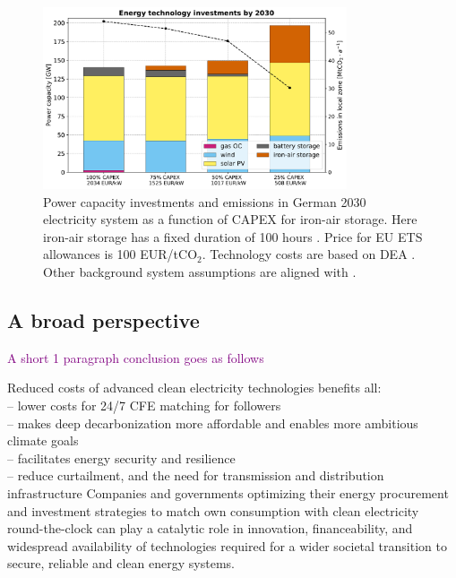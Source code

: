 \documentclass[pdflatex,sn-basic, Numbered]{sn-jnl}%
\theoremstyle{thmstyleone}%
\theoremstyle{thmstyletwo}%
\theoremstyle{thmstylethree}%
\newcommand{\comment}[1]{\textcolor{purple}{#1}}
\begin{document}
\begin{figure}[htbp]
    \centering
    \includegraphics[width=0.8\textwidth]{images/dashboard_3.pdf}
    \caption{Power capacity investments and emissions in German 2030 electricity system as a function of CAPEX for iron-air storage. Here iron-air storage has a fixed duration of 100 hours \cite{FormEnergyLatest2024}. Price for EU ETS allowances is 100 EUR/tCO$_2$. Technology costs are based on DEA \cite{DEA-technologydata}. Other background system assumptions are aligned with \citet{riepin-zenodo-systemlevel247}.}\label{fig:impact}
    \captionsetup{width=0.3\textwidth}  %
\end{figure}


\subsection*{A broad perspective}\label{sec4}

\comment{A short 1 paragraph conclusion goes as follows}

Reduced costs of advanced clean electricity technologies benefits all: \\
-- lower costs for 24/7 CFE matching for followers \\
-- makes deep decarbonization more affordable and enables more ambitious climate goals \\
-- facilitates energy security and resilience \\
-- reduce curtailment, and the need for transmission and distribution infrastructure 
Companies and governments optimizing their energy procurement and investment strategies to match own consumption with clean electricity round-the-clock can play a catalytic role in innovation, financeability, and widespread availability of technologies required for a wider societal transition to secure, reliable and clean energy systems.
\end{document}
